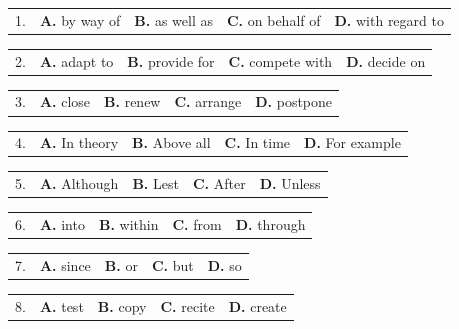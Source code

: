 \documentclass[UTF8,11pt]{ctexart}
\begin{document}
\noindent\begin{tabularx}{\linewidth}{@{}lXXXX@{}}1. & \textbf{A.} by way of & \textbf{B.} as well as & \textbf{C.} on behalf of & \textbf{D.} with regard to\\\end{tabularx}\par

\noindent\begin{tabularx}{\linewidth}{@{}lXXXX@{}}2. & \textbf{A.} adapt to & \textbf{B.} provide for & \textbf{C.} compete with & \textbf{D.} decide on\\\end{tabularx}\par

\noindent\begin{tabularx}{\linewidth}{@{}lXXXX@{}}3. & \textbf{A.} close & \textbf{B.} renew & \textbf{C.} arrange & \textbf{D.} postpone\\\end{tabularx}\par

\noindent\begin{tabularx}{\linewidth}{@{}lXXXX@{}}4. & \textbf{A.} In theory & \textbf{B.} Above all & \textbf{C.} In time & \textbf{D.} For example\\\end{tabularx}\par

\noindent\begin{tabularx}{\linewidth}{@{}lXXXX@{}}5. & \textbf{A.} Although & \textbf{B.} Lest & \textbf{C.} After & \textbf{D.} Unless\\\end{tabularx}\par

\noindent\begin{tabularx}{\linewidth}{@{}lXXXX@{}}6. & \textbf{A.} into & \textbf{B.} within & \textbf{C.} from & \textbf{D.} through\\\end{tabularx}\par

\noindent\begin{tabularx}{\linewidth}{@{}lXXXX@{}}7. & \textbf{A.} since & \textbf{B.} or & \textbf{C.} but & \textbf{D.} so\\\end{tabularx}\par

\noindent\begin{tabularx}{\linewidth}{@{}lXXXX@{}}8. & \textbf{A.} test & \textbf{B.} copy & \textbf{C.} recite & \textbf{D.} create\\\end{tabularx}\par
\end{document}
